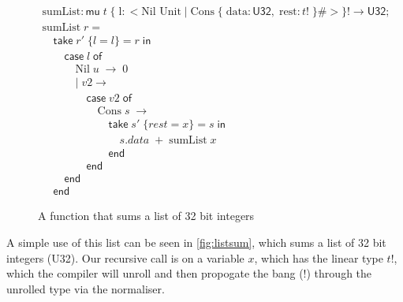 \begin{figure}
    \centering
    \[
        \begin{array}{l}
            \text{sumList} : \textsf{mu}\; t\; \{\; \text{l}: < \text{Nil Unit}\; |\; \text{Cons}\; \{\; \text{data}: \textsf{U32},\; \text{rest}: t!\; \}\# >\}!
                \rightarrow \textsf{U32}; \\
            \text{sumList}\; r = \\
            \hspace{1em}    \textsf{take}\; r'\; \{ l = l \} = r\; \textsf{in}  \\
            \hspace{2em}    \textsf{case}\; l\; \textsf{of} \\
            \hspace{3em}        \text{Nil}\; u\; \rightarrow\; 0 \\
            \hspace{3em}    |\; v2 \rightarrow \\
            \hspace{4em}    \textsf{case}\; v2\; \textsf{of} \\
            \hspace{5em}    \text{Cons}\; s\; \rightarrow  \\
            \hspace{6em}    \textsf{take}\; s'\; \{ rest = x \} = s\; \textsf{in} \hspace{2em} \\
            \hspace{7em}        s.data\; +\; \text{sumList}\; x \\
            \hspace{6em}    \textsf{end} \\
            \hspace{4em}    \textsf{end} \\
            \hspace{2em}    \textsf{end} \\
            \hspace{1em}    \textsf{end}
        \end{array}
    \]
    
    \caption{A function that sums a list of 32 bit integers}
    \label{fig:listsum}
\end{figure}

A simple use of this list can be seen in \autoref{fig:listsum}, which sums a list of
32 bit integers (\textsf{U32}). Our recursive call is on a variable $x$, which has
the linear type $t!$, which the compiler will unroll and then propogate the bang ($!$)
through the unrolled type via the normaliser.

